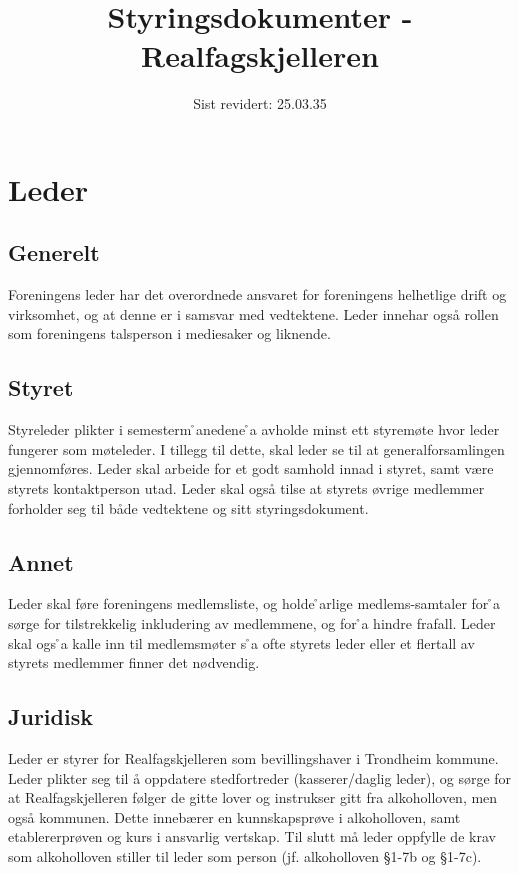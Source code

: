 \documentclass{article}
\title{Styringsdokumenter - Realfagskjelleren}
\date{Sist revidert: 25.03.35}
\begin{document}
\maketitle

\section{Leder}
\subsection{Generelt}
Foreningens leder har det overordnede ansvaret for foreningens helhetlige drift og virksomhet, og at denne er i samsvar med vedtektene. Leder innehar også rollen som foreningens talsperson i mediesaker og liknende.

\subsection{Styret}
Styreleder plikter i semesterm ̊anedene  ̊a avholde minst ett styremøte hvor leder fungerer som møteleder. I tillegg til dette, skal leder se til at generalforsamlingen gjennomføres. Leder skal arbeide for et godt samhold innad i styret, samt være styrets kontaktperson utad. Leder skal også tilse at styrets øvrige medlemmer forholder seg til både vedtektene og sitt styringsdokument.

\subsection{Annet}
Leder skal føre foreningens medlemsliste, og holde  ̊arlige medlems-samtaler for  ̊a sørge for tilstrekkelig inkludering av medlemmene, og for  ̊a hindre frafall. Leder skal ogs ̊a kalle inn til medlemsmøter s ̊a ofte styrets leder eller et flertall av styrets medlemmer finner det nødvendig.

\subsection{Juridisk}
Leder er styrer for Realfagskjelleren som bevillingshaver i Trondheim kommune. Leder plikter seg til å oppdatere stedfortreder (kasserer/daglig leder), og sørge for at Realfagskjelleren følger de gitte lover og instrukser gitt fra alkoholloven, men også kommunen. Dette innebærer en kunnskapsprøve i alkoholloven, samt etablererprøven og kurs i ansvarlig vertskap. Til slutt må leder oppfylle de krav som alkoholloven stiller til leder som person (jf. alkoholloven \S 1-7b og \S 1-7c).
\end{document}
